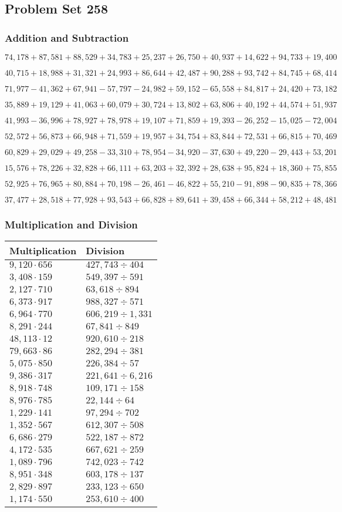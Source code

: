 \hypertarget{problem-set-258}{%
\subsection{Problem Set 258}\label{problem-set-258}}

\hypertarget{addition-and-subtraction}{%
\subsubsection{Addition and
Subtraction}\label{addition-and-subtraction}}

\(74,178+87,581+88,529+34,783+25,237+26,750+40,937+14,622+94,733+19,400\)

\(40,715+18,988+31,321+24,993+86,644+42,487+90,288+93,742+84,745+68,414\)

\(71,977-41,362+67,941-57,797-24,982+59,152-65,558+84,817+24,420+73,182\)

\(35,889+19,129+41,063+60,079+30,724+13,802+63,806+40,192+44,574+51,937\)

\(41,993-36,996+78,927+78,978+19,107+71,859+19,393-26,252-15,025-72,004\)

\(52,572+56,873+66,948+71,559+19,957+34,754+83,844+72,531+66,815+70,469\)

\(60,829+29,029+49,258-33,310+78,954-34,920-37,630+49,220-29,443+53,201\)

\(15,576+78,226+32,828+66,111+63,203+32,392+28,638+95,824+18,360+75,855\)

\(52,925+76,965+80,884+70,198-26,461-46,822+55,210-91,898-90,835+78,366\)

\(37,477+28,518+77,928+93,543+66,828+89,641+39,458+66,344+58,212+48,481\)

\hypertarget{multiplication-and-division}{%
\subsubsection{Multiplication and
Division}\label{multiplication-and-division}}

\begin{longtable}[]{@{}ll@{}}
\toprule
Multiplication & Division\tabularnewline
\midrule
\endhead
\(9,120\cdot656\) & \(427,743÷404\)\tabularnewline
\(3,408\cdot159\) & \(549,397÷591\)\tabularnewline
\(2,127\cdot710\) & \(63,618÷894\)\tabularnewline
\(6,373\cdot917\) & \(988,327÷571\)\tabularnewline
\(6,964\cdot770\) & \(606,219÷1,331\)\tabularnewline
\(8,291\cdot244\) & \(67,841÷849\)\tabularnewline
\(48,113\cdot12\) & \(920,610÷218\)\tabularnewline
\(79,663\cdot86\) & \(282,294÷381\)\tabularnewline
\(5,075\cdot850\) & \(226,384÷57\)\tabularnewline
\(9,386\cdot317\) & \(221,641÷6,216\)\tabularnewline
\(8,918\cdot748\) & \(109,171÷158\)\tabularnewline
\(8,976\cdot785\) & \(22,144÷64\)\tabularnewline
\(1,229\cdot141\) & \(97,294÷702\)\tabularnewline
\(1,352\cdot567\) & \(612,307÷508\)\tabularnewline
\(6,686\cdot279\) & \(522,187÷872\)\tabularnewline
\(4,172\cdot535\) & \(667,621÷259\)\tabularnewline
\(1,089\cdot796\) & \(742,023÷742\)\tabularnewline
\(8,951\cdot348\) & \(603,178÷137\)\tabularnewline
\(2,829\cdot897\) & \(233,123÷650\)\tabularnewline
\(1,174\cdot550\) & \(253,610÷400\)\tabularnewline
\bottomrule
\end{longtable}
